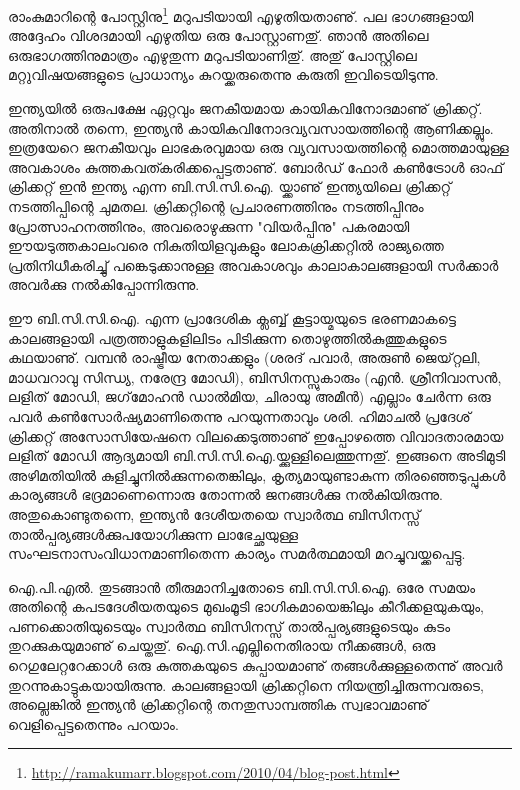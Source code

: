 ﻿
\vskip 2pt

രാംകുമാറിന്റെ പോസ്റ്റിനു\footnote{\url{http://ramakumarr.blogspot.com/2010/04/blog-post.html}} മറുപടിയായി എഴുതിയതാണു്. പല ഭാഗങ്ങളായി അദ്ദേഹം വിശദമായി എഴുതിയ ഒരു പോസ്റ്റാണതു്. ഞാന്‍ അതിലെ ഒരുഭാഗത്തിനുമാത്രം എഴുതുന്ന മറുപടിയാണിതു്. അതു് പോസ്റ്റിലെ മറ്റുവിഷയങ്ങളുടെ പ്രാധാന്യം കുറയ്ക്കരുതെന്നു കരുതി ഇവിടെയിടുന്നു.

ഇന്ത്യയില്‍ ഒരുപക്ഷേ ഏറ്റവും ജനകീയമായ കായികവിനോദമാണു് ക്രിക്കറ്റ്. അതിനാല്‍ തന്നെ, ഇന്ത്യന്‍ കായികവിനോദവ്യവസായത്തിന്റെ ആണിക്കല്ലും. ഇത്രയേറെ ജനകീയവും ലാഭകരവുമായ ഒരു വ്യവസായത്തിന്റെ മൊത്തമായുള്ള അവകാശം കുത്തകവത്കരിക്കപ്പെട്ടതാണു്. ബോര്‍ഡ് ഫോര്‍ കണ്‍ട്രോള്‍ ഓഫ് ക്രിക്കറ്റ് ഇന്‍ ഇന്ത്യ എന്ന ബി.സി.സി.ഐ. യ്ക്കാണു് ഇന്ത്യയിലെ ക്രിക്കറ്റ് നടത്തിപ്പിന്റെ ചുമതല. ക്രിക്കറ്റിന്റെ പ്രചാരണത്തിനും നടത്തിപ്പിനും പ്രോത്സാഹനത്തിനും, അവരൊഴുക്കുന്ന "വിയര്‍പ്പിനു" പകരമായി ഈയടുത്തകാലംവരെ നികുതിയിളവുകളും ലോകക്രിക്കറ്റില്‍ രാജ്യത്തെ പ്രതിനിധീകരിച്ചു് പങ്കെടുക്കാനുള്ള അവകാശവും കാലാകാലങ്ങളായി സര്‍ക്കാര്‍ അവര്‍ക്കു നല്‍കിപ്പോന്നിരുന്നു.

ഈ ബി.സി.സി.ഐ. എന്ന പ്രാദേശിക ക്ലബ്ബ് കൂട്ടായ്മയുടെ ഭരണമാകട്ടെ കാലങ്ങളായി പത്രത്താളുകളിലിടം പിടിക്കുന്ന തൊഴുത്തില്‍കുത്തുകളുടെ കഥയാണു്. വമ്പന്‍ രാഷ്ട്രീയ നേതാക്കളും (ശരദ് പവാര്‍, അരുണ്‍ ജെയ്റ്റലി, മാധവറാവു സിന്ധ്യ, നരേന്ദ്ര മോഡി), ബിസിനസ്സുകാരും (എന്‍. ശ്രീനിവാസന്‍, ലളിത് മോഡി, ജഗ്‌മോഹന്‍ ഡാല്‍മിയ, ചിരായു അമീന്‍) എല്ലാം ചേര്‍ന്ന ഒരു പവര്‍ കണ്‍സോര്‍ഷ്യമാണിതെന്നു പറയുന്നതാവും ശരി. ഹിമാചല്‍ പ്രദേശ് ക്രിക്കറ്റ് അസോസിയേഷനെ വിലക്കെടുത്താണു് ഇപ്പോഴത്തെ വിവാദതാരമായ ലളിത് മോഡി ആദ്യമായി ബി.സി.സി.ഐ.യ്ക്കുള്ളിലെത്തുന്നതു്. ഇങ്ങനെ അടിമുടി അഴിമതിയില്‍ കുളിച്ചുനില്‍ക്കുന്നതെങ്കിലും, കൃത്യമായുണ്ടാകുന്ന തിരഞ്ഞെടുപ്പുകള്‍ കാര്യങ്ങള്‍ ഭദ്രമാണെന്നൊരു തോന്നല്‍ ജനങ്ങള്‍ക്കു നല്‍കിയിരുന്നു. അതുകൊണ്ടുതന്നെ, ഇന്ത്യന്‍ ദേശീയതയെ സ്വാര്‍ത്ഥ ബിസിനസ്സ് താല്‍പ്പര്യങ്ങള്‍ക്കുപയോഗിക്കുന്ന ലാഭേച്ഛയുള്ള സംഘടനാസംവിധാനമാണിതെന്ന കാര്യം സമര്‍ത്ഥമായി മറച്ചുവയ്ക്കപ്പെട്ടു.

ഐ.പി.എല്‍. തുടങ്ങാന്‍ തീരുമാനിച്ചതോടെ ബി.സി.സി.ഐ. ഒരേ സമയം അതിന്റെ കപടദേശീയതയുടെ മുഖംമൂടി ഭാഗികമായെങ്കിലും കീറീക്കളയുകയും, പണക്കൊതിയുടെയും സ്വാര്‍ത്ഥ ബിസിനസ്സ് താല്‍പ്പര്യങ്ങളുടെയും കുടം തുറക്കുകയുമാണു് ചെയ്തതു്. ഐ.സി.എല്ലിനെതിരായ നീക്കങ്ങള്‍, ഒരു റെഗുലേറ്ററേക്കാള്‍ ഒരു കുത്തകയുടെ കുപ്പായമാണു് തങ്ങള്‍ക്കുള്ളതെന്നു് അവര്‍ തുറന്നുകാട്ടുകയായിരുന്നു. കാലങ്ങളായി ക്രിക്കറ്റിനെ നിയന്ത്രിച്ചിരുന്നവരുടെ, അല്ലെങ്കില്‍ ഇന്ത്യന്‍ ക്രിക്കറ്റിന്റെ തനതുസാമ്പത്തിക സ്വഭാവമാണു് വെളിപ്പെട്ടതെന്നും പറയാം.


